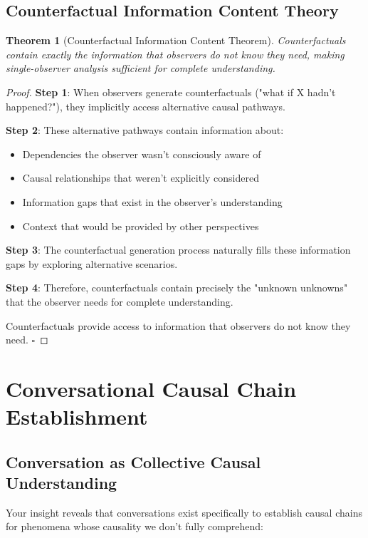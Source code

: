 \documentclass[11pt,a4paper]{article}
\newtheorem{theorem}{Theorem}[section]
\begin{document}
\subsection{Counterfactual Information Content Theory}

\begin{theorem}[Counterfactual Information Content Theorem]
Counterfactuals contain exactly the information that observers do not know they need, making single-observer analysis sufficient for complete understanding.
\end{theorem}

\begin{proof}
\textbf{Step 1}: When observers generate counterfactuals ("what if X hadn't happened?"), they implicitly access alternative causal pathways.

\textbf{Step 2}: These alternative pathways contain information about:
\begin{itemize}
\item Dependencies the observer wasn't consciously aware of
\item Causal relationships that weren't explicitly considered
\item Information gaps that exist in the observer's understanding
\item Context that would be provided by other perspectives
\end{itemize}

\textbf{Step 3}: The counterfactual generation process naturally fills these information gaps by exploring alternative scenarios.

\textbf{Step 4}: Therefore, counterfactuals contain precisely the "unknown unknowns" that the observer needs for complete understanding.

Counterfactuals provide access to information that observers do not know they need. $\square$
\end{proof}

\section{Conversational Causal Chain Establishment}

\subsection{Conversation as Collective Causal Understanding}

Your insight reveals that conversations exist specifically to establish causal chains for phenomena whose causality we don't fully comprehend:
\end{document}
